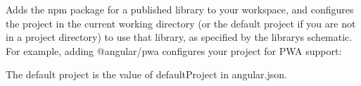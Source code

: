 Adds the npm package for a published library to your workspace, and configures the project in the current working directory (or the default project if you are not in a project directory) to use that library, as specified by the library\textquotesingle{}s schematic. For example, adding {\ttfamily @angular/pwa} configures your project for PWA support\+:


\begin{DoxyCode}{0}

\end{DoxyCode}


The default project is the value of {\ttfamily default\+Project} in {\ttfamily angular.\+json}. 